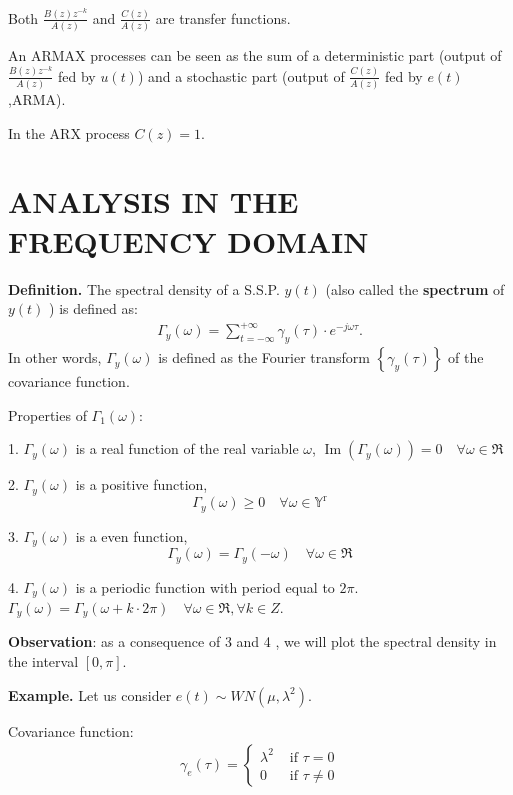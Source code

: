Both $\frac{B(z) z^{-k}}{A(z)}$ and $\frac{C(z)}{A(z)}$ are transfer functions.

An ARMAX processes can be seen as the sum of a deterministic part (output of $\frac{B(z) z^{-k}}{A(z)}$ fed by $u(t)$) and a stochastic part (output of $\frac{C(z)}{A(z)}$ fed by $e(t)$,ARMA).

In the ARX process $C(z)=1$.

\section{ANALYSIS IN THE FREQUENCY DOMAIN}
\textbf{Definition.}
The spectral density of a S.S.P. $y(t)$ (also called the \textbf{spectrum} of $y(t)$ ) is defined as:
\begin{align*}
	\Gamma_{y}(\omega)=\sum_{t=-\infty}^{+\infty} \gamma_{y}(\tau) \cdot e^{-j \omega \tau}.
\end{align*}
In other words, $\Gamma_y(\omega)$ is defined as the Fourier transform $\left\{\gamma_{y}(\tau)\right\}$ of the covariance function.

Properties of $\Gamma_{1}(\omega)$:

1. $\Gamma_{y}(\omega)$ is a real function of the real variable $\omega$, $\operatorname{Im}\left(\Gamma_{y}(\omega)\right)=0 \quad \forall \omega \in \Re$

2. $\Gamma_{y}(\omega)$ is a positive function,
$$
\Gamma_{y}(\omega) \geq 0 \quad \forall \omega \in \mathbb{Y}^{\mathrm{r}}
$$

3. $\Gamma_{y}(\omega)$ is a even function,
$$
\Gamma_{y}(\omega)=\Gamma_{y}(-\omega) \quad \forall \omega \in \Re
$$

4. $\Gamma_{y}(\omega)$ is a periodic function with period equal to $2 \pi$.  $\Gamma_{y}(\omega)=\Gamma_{y}(\omega+k \cdot 2 \pi) \quad \forall \omega \in \Re, \forall k \in Z$.

\textbf{Observation}: as a consequence of 3 and 4 , we will plot the spectral density in the interval $[0, \pi]$.

\textbf{Example.} Let us consider $e(t) \sim W N\left(\mu, \lambda^{2}\right)$. 

Covariance function:
\begin{align*}
	\gamma_{e}(\tau)= \begin{cases}\lambda^{2} & \text { if } \tau=0 \\ 0 & \text { if } \tau \neq 0\end{cases}
\end{align*}


